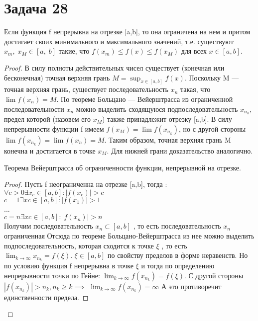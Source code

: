 \section*{Задача 28}
\begin{ther}
Если функция f непрерывна на отрезке [a,b],
то она ограничена на нем и притом достигает своих минимального и максимального значений,
т.е. существуют $ x_m,\;x_M\in[a,\;b]$ такие,
что $f(x_{m})\leq f(x)\leq f(x_{M})$
для всех $x\in [a,b]$.
\begin{proof}
В силу полноты действительных чисел существует (конечная или бесконечная) точная
верхняя грань $M=\sup _{{x\in [a,b]}}f(x)$.
Поскольку M — точная верхняя грань, существует последовательность
$x_{n}$ такая, что $\lim f(x_{n})=M$.
По теореме Больцано — Вейерштрасса из ограниченной последовательности
$x_{n}$ можно выделить сходящуюся подпоследовательность $x_{{n_{k}}}$,
предел которой (назовем его $x_M$) также принадлежит отрезку
[a,b]. В силу непрерывности функции f имеем
$f(x_{M})=\lim f(x_{{n_{k}}})$, но с другой стороны $\lim f(x_{{n_{k}}})=\lim f(x_{n})=M$.
Таким образом, точная верхняя грань  M конечна и достигается в точке $x_M$.
Для нижней грани доказательство аналогично.
\begin{ther}
Теорема Вейерштрасса об ограниченности функции, непрерывной на отрезке.
\end{ther}
\begin{proof}
	Пусть f неограниченна на отрезке [a,b], тогда :
	$\forall c>0 \exists x_{c} \in [a,b]:|f(x_{c})|>c$\\
	$c=1 \exists xc \in [a,b]:|f(x_{1})|>1$\\
	...\\
	$c=n \exists xc \in [a,b]:|f(x_{n})|>n$\\
	Получим последовательность $x_{n} \subset [a,b]$ ,
	то есть последовательность $x_{n}$ ограниченная
Отсюда по теореме Больцано-Вейерштрасса из нее можно выделить подпоследовательность,
 которая сходится к точке $\xi$ , то есть $\lim_{k\to \infty}{x_{n_{k}}} = f(\xi)$.
 $\xi \in [a,b]$ по свойству пределов в форме неравенств. Но по условию функция f
 непрерывна в точке $\xi$ и тогда по определению непрерывности точки по Гейне:
 $\lim_{k\to \infty}{f(x_{n_{k}})} = f(\xi)$. С другой стороны $|f(x_{n_{k}})|
 > n_{k}, n_{k} \geq k \implies$ $\lim_{k\to \infty}{f(x_{n_{k}})} = \infty$
 А это противоречит единственности предела.
\end{proof}
\end{proof}
\end{ther}

